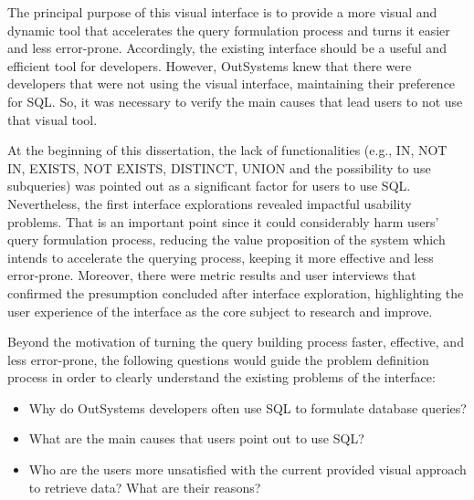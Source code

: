 The principal purpose of this visual interface is to provide a more visual and dynamic tool that accelerates the query formulation process and turns it easier and less error-prone. Accordingly, the existing interface should be a useful and efficient tool for developers. However, OutSystems knew that there were developers that were not using the visual interface, maintaining their preference for SQL. So, it was necessary to verify the main causes that lead users to not use that visual tool. 

At the beginning of this dissertation, the lack of functionalities (e.g., IN, NOT IN, EXISTS, NOT EXISTS, DISTINCT, UNION and the possibility to use subqueries) was pointed out as a significant factor for users to use SQL. Nevertheless, the first interface explorations revealed impactful usability problems. That is an important point since it could considerably harm users' query formulation process, reducing the value proposition of the system which intends to accelerate the querying process, keeping it more effective and less error-prone. Moreover, there were metric results and user interviews that confirmed the presumption concluded after interface exploration, highlighting the user experience of the interface as the core subject to research and improve.

Beyond the motivation of turning the query building process faster, effective, and less error-prone, the following questions would guide the problem definition process in order to clearly understand the existing problems of the interface:

\begin{itemize}
  \item Why do OutSystems developers often use \gls{SQL} to formulate database queries?
  \item What are the main causes that users point out to use \gls{SQL}?
  \item Who are the users more unsatisfied with the current provided visual approach to retrieve data? What are their reasons?
\end{itemize}



